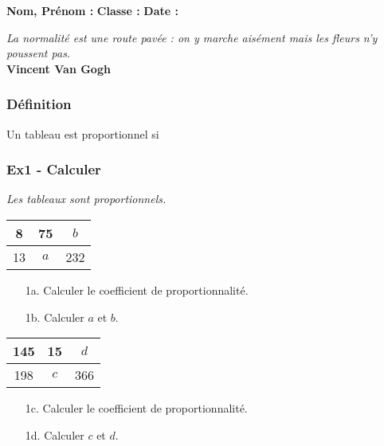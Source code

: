 



\textbf{Nom, Prénom :} \hspace{8cm} \textbf{Classe :} \hspace{3cm} \textbf{Date :}\\

\begin{center}
  \textit{La normalité est une route pavée : on y marche aisément mais les fleurs n’y poussent pas.} \\ 
  \textbf{Vincent Van Gogh}
\end{center}

\subsubsection*{Définition} 

Un tableau est proportionnel si \dotfill \\ \Pointilles[2]

\subsubsection*{Ex1 - Calculer} 

\textit{Les tableaux sont proportionnels.} 

\begin{multicols}{2}\noindent
  \begin{center} \begin{tabular}{|c|c|c|}  \hline
    8  &                                75 & $b$ \\  \hline
    13 & $a$ & 232\\  \hline
  \end{tabular} \end{center}
  \begin{enumerate}
    \item[1a.] Calculer le coefficient de proportionnalité.
    \item[1b.] Calculer $a$ et $b$.
  \end{enumerate}
  \Pointilles[8] \columnbreak

  \begin{center} \begin{tabular}{|c|c|c|}  \hline
    145 & 15 & $d$ \\  \hline
                                  198 & $c$ & 366\\  \hline
  \end{tabular} \end{center}

  \begin{enumerate}
    \item[1c.] Calculer le coefficient de proportionnalité.
    \item[1d.] Calculer $c$ et $d$.
  \end{enumerate}
  \Pointilles[8]
\end{multicols}


